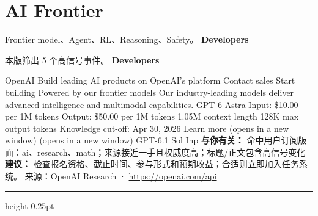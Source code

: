\documentclass[10.5pt]{ctexart}
\begin{document}
\section*{AI Frontier}
{\color{ormuted} Frontier model、Agent、RL、Reasoning、Safety。}
\vspace{2mm}
{\LARGE\bfseries Developers}\par
\vspace{1mm}
{\color{ormuted} 本版筛出 5 个高信号事件。}
\vspace{3mm}
{\Large\bfseries Developers}\par
OpenAI Build leading AI products on OpenAI’s platform Contact sales Start building Powered by our frontier models Our industry-leading models deliver advanced intelligence and multimodal capabilities. GPT-6 Astra Input: \$10.00 per 1M tokens Output: \$50.00 per 1M tokens 1.05M context length 128K max output tokens Knowledge cut-off: Apr 30, 2026 Learn more (opens in a new window) (opens in a new window) GPT-6.1 Sol Inp
\textbf{与你有关：} 命中用户订阅版面：ai、research、math；来源接近一手且权威度高；标题/正文包含高信号变化
\textbf{建议：} 检查报名资格、截止时间、参与形式和预期收益；合适则立即加入任务系统。
{\footnotesize\color{ormuted} 来源：OpenAI Research · \url{https://openai.com/api}}
\vspace{4mm}
\hrule height 0.25pt
\vspace{3mm}
\end{document}
